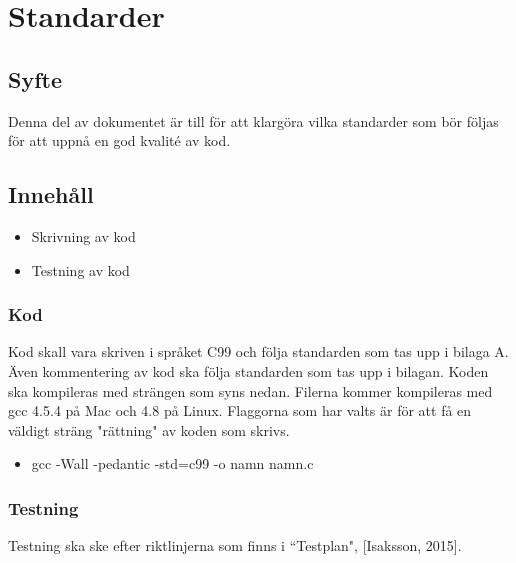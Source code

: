 \section{Standarder}

\subsection{Syfte}
Denna del av dokumentet är till för att klargöra vilka standarder som bör följas för att uppnå en god kvalité av kod.

\subsection{Innehåll}
\begin{itemize}
\item Skrivning av kod
\item Testning av kod
\end{itemize}

\subsubsection{Kod}
Kod skall vara skriven i språket C99 och följa standarden som tas upp i bilaga A. Även kommentering av kod ska följa standarden som tas upp i bilagan. 
\newline
\newline
Koden ska kompileras med strängen som syns nedan. Filerna kommer kompileras med gcc 4.5.4 på Mac och 4.8 på Linux. Flaggorna som har valts är för att få en väldigt sträng "rättning" av koden som skrivs. 

\begin{itemize}
\item gcc -Wall -pedantic -std=c99 -o namn namn.c
\end{itemize}

\subsubsection{Testning}
Testning ska ske efter riktlinjerna som finns i ``Testplan", [Isaksson, 2015]. 
